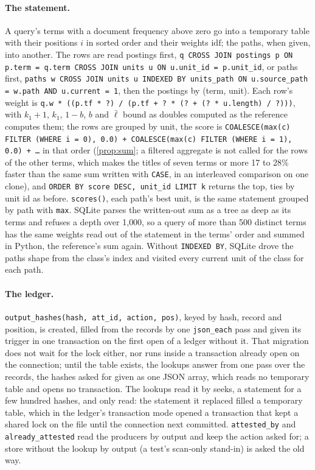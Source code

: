 \documentclass[11pt]{article}
\theoremstyle{plain}
\theoremstyle{definition}
\theoremstyle{remark}
\newcommand{\code}[1]{\texttt{#1}}
\begin{document}
\paragraph{The statement.} A query's terms with a document frequency above zero go into a
temporary table with their positions $i$ in sorted order and their weights $\mathrm{idf}$; the
paths, when given, into another. The rows are read postings first,
\code{q CROSS JOIN postings p ON p.term = q.term CROSS JOIN units u ON u.unit\_id = p.unit\_id},
or paths first, \code{paths w CROSS JOIN units u INDEXED BY units\_path ON u.source\_path = w.path
AND u.current = 1}, then the postings by (term, unit). Each row's weight is
\code{q.w * ((p.tf * ?) / (p.tf + ? * (? + (? * u.length) / ?)))}, with $k_1 + 1$, $k_1$, $1 - b$,
$b$ and $\bar\ell$ bound as doubles computed as the reference computes them; the rows are grouped
by unit, the score is \code{COALESCE(max(c) FILTER (WHERE i = 0), 0.0) + COALESCE(max(c) FILTER
(WHERE i = 1), 0.0) + \dots} in that order (\cref{prop:sum}; a filtered aggregate is not called for
the rows of the other terms, which makes the titles of seven terms or more 17 to 28\% faster than
the same sum written with \code{CASE}, in an interleaved comparison on one clone), and
\code{ORDER BY score DESC, unit\_id LIMIT k} returns the top, ties by unit id as before. \code{scores()}, each path's best unit, is the same statement grouped by path with
\code{max}. SQLite parses the written-out sum as a tree as deep as its terms and refuses a depth
over 1{,}000, so a query of more than 500 distinct terms has the same weights read out of the
statement in the terms' order and summed in Python, the reference's sum again. Without
\code{INDEXED BY}, SQLite drove the paths shape from the class's index and visited every current
unit of the class for each path.

\paragraph{The ledger.} \code{output\_hashes(hash, att\_id, action, pos)}, keyed by hash, record
and position, is created, filled from the records by one \code{json\_each} pass and given its
trigger in one transaction on the first open of a ledger without it. That migration does not wait
for the lock either, nor runs inside a transaction already open on the connection; until the table
exists, the lookups answer from one pass over the records, the hashes asked for given as one JSON
array, which reads no temporary table and opens no transaction. The lookups read it by seeks, a statement
for a few hundred hashes, and only read: the statement it replaced filled a temporary table, which
in the ledger's transaction mode opened a transaction that kept a shared lock on the file until the
connection next committed. \code{attested\_by} and \code{already\_attested} read the producers by
output and keep the action asked for; a store without the lookup by output (a test's scan-only
stand-in) is asked the old way.
\end{document}

